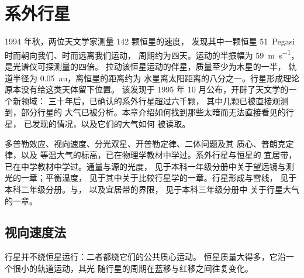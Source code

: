 \chapter{系外行星}\label{ch:b3:exoplanets}

1994 年秋，两位天文学家测量 142 颗恒星的速度，
发现其中一颗恒星 51~Pegasi 时而朝向我们、时而远离我们运动，
周期约为四天。运动的半振幅为
\qty{59}{m.s^{-1}}，是光谱仪可探测量的四倍。
拉动该恒星运动的伴星，质量至少为木星的一半，
轨道半径为 \qty{0.05}{au}，离恒星的距离约为
水星离太阳距离的八分之一。行星形成理论原本没有给这类天体留下位置。
该发现于 1995 年 10 月公布，开辟了天文学的一个新领域：
三十年后，已确认的系外行星超过六千颗，
其中几颗已被直接观测到，部分行星的
大气已被分析。本章介绍如何找到那些太暗而无法直接看见的行星，
已发现的情况，以及它们的大气如何
被读取。

\begin{recall}
多普勒效应、视向速度、分光双星、开普勒定律、二体问题及其
质心、普朗克定律，以及
等温大气的标高，已在物理学教材中学过。系外行星与恒星的
宜居带，已在中学教材中学过。通量与源的光度，
见于本科一年级分册中关于望远镜与测光的一章；平衡温度，
见于其中关于比较行星学的一章。行星形成与雪线，
见于本科二年级分册。与，
以及宜居带的界限，
见于本科三年级分册中
关于行星大气的一章。
\end{recall}

\section{视向速度法}\label{sec:b3:exoplanets:rv}

行星并不绕恒星运行：二者都绕它们的公共质心运动。
恒星质量大得多，它沿一个很小的轨道运动，其光
随行星的周期在蓝移与红移之间往复变化。

